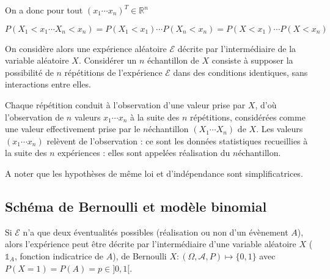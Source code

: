 \documentclass[letterpaper,10pt,french]{sphinxmanual}
\begin{document}
\sphinxAtStartPar
On a donc pour tout \((x_1\cdots x_n)^T\in\mathbb{R}^n\)

\sphinxAtStartPar
\(P(X_1<x_1\cdots X_n<x_n)=P(X_1<x_1)\cdots P(X_n<x_n)=P(X<x_1)\cdots P(X<x_n)\)

\sphinxAtStartPar
On considère alors une expérience aléatoire \(\mathcal E\) décrite par l’intermédiaire de la variable aléatoire \(X\). Considérer un \(n\) échantillon de \(X\) consiste à supposer la possibilité de \(n\) répétitions de l’expérience \(\mathcal E\) dans des conditions identiques, sans interactions entre elles.

\sphinxAtStartPar
Chaque répétition conduit à l’observation d’une valeur prise par \(X\), d’où l’observation de \(n\) valeurs \(x_1\cdots x_n\) à la suite des \(n\) répétitions, considérées comme une valeur effectivement prise par le \(n\)\sphinxhyphen{}échantillon \((X_1\cdots X_n)\) de \(X\). Les valeurs \((x_1\cdots x_n)\)  relèvent de l’observation : ce sont les données statistiques recueillies à la suite des \(n\) expériences : elles sont appelées réalisation du \(n\)\sphinxhyphen{}échantillon.

\sphinxAtStartPar
A noter que les hypothèses de même loi et d’indépendance sont simplificatrices.


\subsection{Schéma de Bernoulli et modèle binomial}
\label{\detokenize{elemstats:schema-de-bernoulli-et-modele-binomial}}
\sphinxAtStartPar
Si \(\mathcal E\) n’a que deux éventualités possibles (réalisation ou non d’un évènement \(A\)), alors l’expérience peut être décrite par l’intermédiaire d’une variable aléatoire \(X\) (\(\mathbb{1}_A\), fonction indicatrice de \(A\)), de Bernoulli \(X:(\Omega,\mathcal A,P)\mapsto \{0,1\}\) avec \(P(X=1)=P(A)=p\in]0,1[\).
\end{document}
